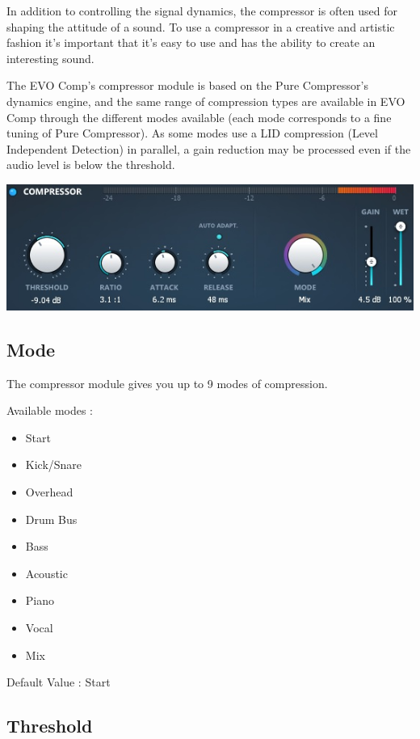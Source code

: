 \documentclass[
  letterpaper,
  DIV=11,
  numbers=noendperiod]{scrreport}
\providecommand{\tightlist}{%
  \setlength{\itemsep}{0pt}\setlength{\parskip}{0pt}}\usepackage{longtable,booktabs,array}
\begin{document}
In addition to controlling the signal dynamics, the compressor is often
used for shaping the attitude of a sound. To use a compressor in a
creative and artistic fashion it's important that it's easy to use and
has the ability to create an interesting sound.

The EVO Comp's compressor module is based on the Pure Compressor's
dynamics engine, and the same range of compression types are available
in EVO Comp through the different modes available (each mode corresponds
to a fine tuning of Pure Compressor). As some modes use a LID
compression (Level Independent Detection) in parallel, a gain reduction
may be processed even if the audio level is below the threshold.

\includegraphics{include/ManualEvoChannel-010.jpg}

\hypertarget{mode}{%
\subsection{Mode}\label{mode}}

The compressor module gives you up to 9 modes of compression.

Available modes :

\begin{itemize}
\tightlist
\item
  Start
\item
  Kick/Snare
\item
  Overhead
\item
  Drum Bus
\item
  Bass
\item
  Acoustic
\item
  Piano
\item
  Vocal
\item
  Mix
\end{itemize}

Default Value : Start

\hypertarget{threshold}{%
\subsection{Threshold}\label{threshold}}
\end{document}
